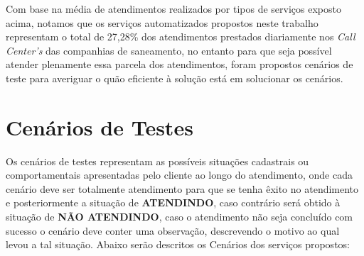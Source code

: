 Com base na média de atendimentos realizados por tipos de serviços exposto acima, notamos que os serviços automatizados propostos neste trabalho representam o total de 27,28\% dos atendimentos prestados diariamente nos \textit{Call Center’s} das companhias de saneamento, no entanto para que seja possível atender plenamente essa parcela dos atendimentos, foram propostos cenários de teste para averiguar o quão eficiente à solução está em solucionar os cenários.




\section{Cenários de Testes}

Os cenários de testes representam as possíveis situações cadastrais ou comportamentais apresentadas pelo cliente ao longo do atendimento, onde cada cenário deve ser totalmente atendimento para que se tenha êxito no atendimento e posteriormente a situação de \textbf{ATENDINDO}, caso contrário será obtido à situação de \textbf{NÃO ATENDINDO}, caso o atendimento não seja concluído com sucesso o cenário deve conter uma observação, descrevendo o motivo ao qual levou a tal situação.
Abaixo serão descritos os Cenários dos serviços propostos:

